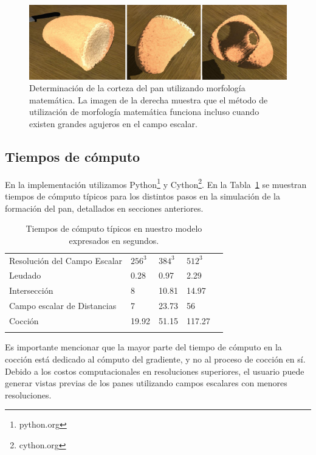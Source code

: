 \begin{figure}
  \centerline{\includegraphics[width=13cm]{figures/crusts}}
  \caption[Determinación de la corteza del pan utilizando morfología matemática]{Determinación de la corteza del pan utilizando morfología matemática. La imagen de la derecha muestra que el método de utilización de morfología matemática funciona incluso cuando existen grandes agujeros en el campo escalar.}
  \label{fg:crusts}
\end{figure}

\subsection{Tiempos de cómputo}
En la implementación utilizamos Python\footnote{python.org} y Cython\footnote{cython.org}.
En la Tabla~\ref{tab:computingtimes} se muestran tiempos de cómputo típicos para los distintos pasos en la simulación de la formación del pan, detallados en secciones anteriores. %

\begin{table}[h!]
\begin{tabular}{lllll}
\hline\noalign{\smallskip}
Resolución del Campo Escalar & $256^{3}$ & $384^{3}$  & $512^{3}$ \\
\noalign{\smallskip}\hline\noalign{\smallskip}
Leudado & 0.28 & 0.97 & 2.29 \\
Intersección & 8 & 10.81 & 14.97 \\
Campo escalar de Distancias & 7 & 23.73 & 56 \\
Cocción & 19.92 & 51.15 & 117.27 \\
\noalign{\smallskip}\hline
\end{tabular}
\caption{Tiempos de cómputo típicos en nuestro modelo expresados en segundos.}
\label{tab:computingtimes}
\end{table}

Es importante mencionar que la mayor parte del tiempo de cómputo en la cocción está dedicado al cómputo del gradiente, y no al proceso de cocción en sí.
Debido a los costos computacionales en resoluciones superiores, el usuario puede generar vistas previas de los panes utilizando campos escalares con menores resoluciones.


